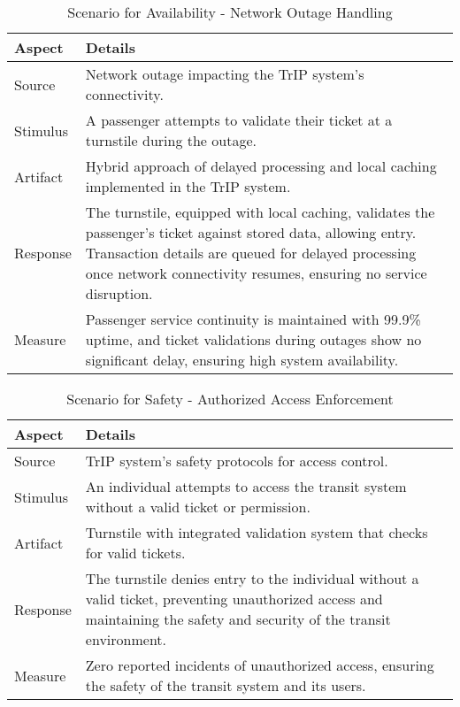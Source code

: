 \begin{table}[H]
    \centering
    \begin{tabularx}{\textwidth}{@{} lX @{}}
    \toprule
    \textbf{Aspect} & \textbf{Details} \\
    \midrule
    Source & Network outage impacting the TrIP system's connectivity. \\
    Stimulus & A passenger attempts to validate their ticket at a turnstile during the outage. \\
    Artifact & Hybrid approach of delayed processing and local caching implemented in the TrIP system. \\
    Response & The turnstile, equipped with local caching, validates the passenger's ticket against stored data, allowing entry. Transaction details are queued for delayed processing once network connectivity resumes, ensuring no service disruption. \\
    Measure & Passenger service continuity is maintained with 99.9\% uptime, and ticket validations during outages show no significant delay, ensuring high system availability. \\
    \bottomrule
    \end{tabularx}
    \caption{Scenario for Availability - Network Outage Handling}
    \label{table:availability_network_outage}
\end{table}

\begin{table}[H]
    \centering
    \begin{tabularx}{\textwidth}{@{} lX @{}}
    \toprule
    \textbf{Aspect} & \textbf{Details} \\
    \midrule
    Source & TrIP system's safety protocols for access control. \\
    Stimulus & An individual attempts to access the transit system without a valid ticket or permission. \\
    Artifact & Turnstile with integrated validation system that checks for valid tickets. \\
    Response & The turnstile denies entry to the individual without a valid ticket, preventing unauthorized access and maintaining the safety and security of the transit environment. \\
    Measure & Zero reported incidents of unauthorized access, ensuring the safety of the transit system and its users. \\
    \bottomrule
    \end{tabularx}
    \caption{Scenario for Safety - Authorized Access Enforcement}
    \label{table:safety_authorized_access}
\end{table}

